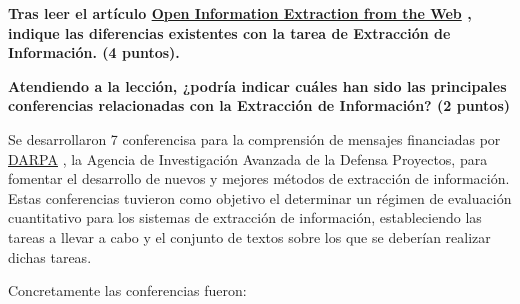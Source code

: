 \documentclass[11pt]{exam}
\begin{document}
\begin{questions}
{\bf \question Tras leer el artículo \href{https://www.aaai.org/Papers/IJCAI/2007/IJCAI07-429.pdf}{Open Information Extraction from the Web} , indique las diferencias existentes con la tarea de Extracción de Información. (4 puntos).}

{\bf \question Atendiendo a la lección, ¿podría indicar cuáles han sido las principales conferencias relacionadas con la Extracción de Información? (2 puntos)}

Se desarrollaron 7 conferencisa para la comprensión de mensajes financiadas por \href{https://es.qwe.wiki/wiki/DARPA}{DARPA} , la Agencia de Investigación Avanzada de la Defensa Proyectos, para fomentar el desarrollo de nuevos y mejores métodos de extracción de información. Estas conferencias tuvieron como objetivo el determinar un régimen de evaluación cuantitativo para los sistemas de extracción de información, estableciendo las tareas a llevar a cabo y el conjunto de textos sobre los que se deberían realizar dichas tareas.

Concretamente las conferencias fueron:


\end{questions}
\end{document}
